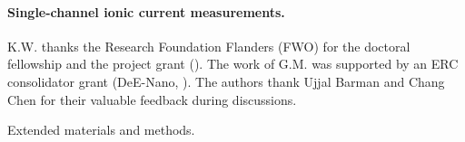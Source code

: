 \documentclass[journal=ancac3,manuscript=article,etalmode=truncate,maxauthors=0,layout=twocolumn]{achemso}
\begin{document}
\paragraph{Single-channel ionic current measurements.}

\begin{acknowledgement}
K.W. thanks the Research Foundation Flanders (FWO) for the doctoral fellowship and the project grant 
(). The work of G.M. was supported by an ERC consolidator grant (DeE-Nano, ).
The authors thank Ujjal Barman and Chang Chen for their valuable feedback during discussions.
\end{acknowledgement}


\begin{suppinfo}
	Extended materials and methods.
\end{suppinfo}




%
\end{document}
